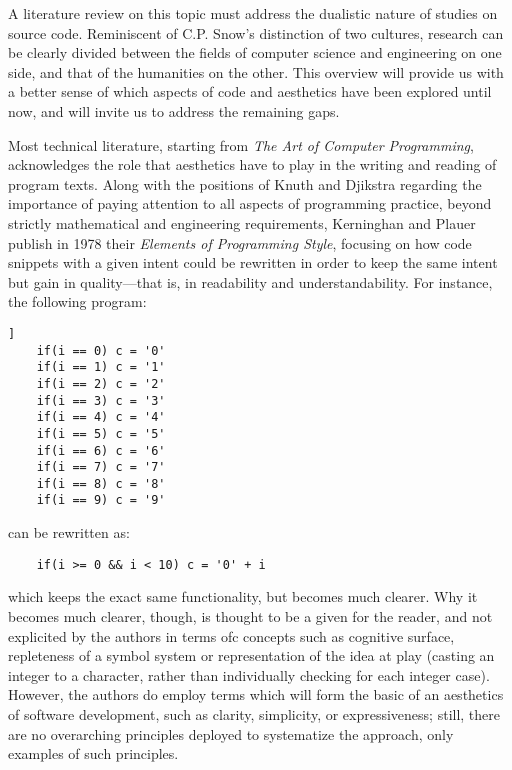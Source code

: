 A literature review on this topic must address the dualistic nature of studies on source code. Reminiscent of C.P. Snow's distinction of two cultures, research can be clearly divided between the fields of computer science and engineering on one side, and that of the humanities on the other. This overview will provide us with a better sense of which aspects of code and aesthetics have been explored until now, and will invite us to address the remaining gaps.

Most technical literature, starting from \emph{The Art of Computer Programming}, acknowledges the role that aesthetics have to play in the writing and reading of program texts. Along with the positions of Knuth and Djikstra regarding the importance of paying attention to all aspects of programming practice, beyond strictly mathematical and engineering requirements, Kerninghan and Plauer publish in 1978 their \emph{Elements of Programming Style}\cite{kernighan_elements_1978}, focusing on how code snippets with a given intent could be rewritten in order to keep the same intent but gain in quality—that is, in readability and understandability. For instance, the following program:

\begin{lstlisting}]
    if(i == 0) c = '0'
    if(i == 1) c = '1'
    if(i == 2) c = '2'
    if(i == 3) c = '3'
    if(i == 4) c = '4'
    if(i == 5) c = '5'
    if(i == 6) c = '6'
    if(i == 7) c = '7'
    if(i == 8) c = '8'
    if(i == 9) c = '9'
\end{lstlisting}

can be rewritten as:

\begin{lstlisting}
    if(i >= 0 && i < 10) c = '0' + i
\end{lstlisting}

which keeps the exact same functionality, but becomes much clearer. Why it becomes much clearer, though, is thought to be a given for the reader, and not explicited by the authors in terms ofc concepts such as cognitive surface, repleteness of a symbol system or representation of the idea at play (casting an integer to a character, rather than individually checking for each integer case). However, the authors do employ terms which will form the basic of an aesthetics of software development, such as clarity, simplicity, or expressiveness; still, there are no overarching principles deployed to systematize the approach, only examples of such principles.

